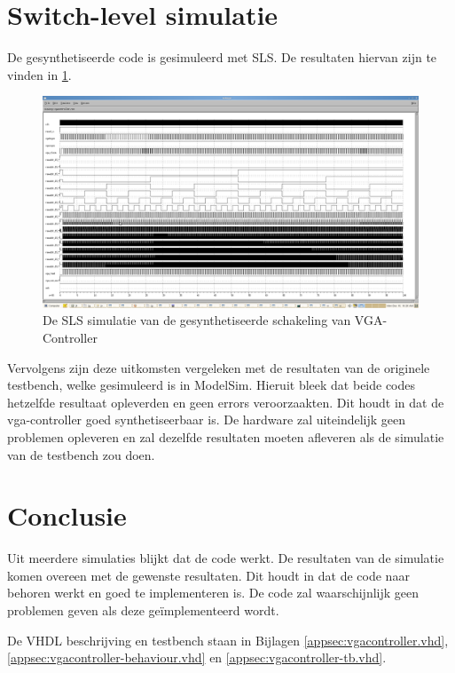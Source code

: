 \documentclass{scrartcl}  %
\begin{document}
\section{Switch-level simulatie}
De gesynthetiseerde code is gesimuleerd met SLS. De resultaten hiervan zijn te vinden in \ref{fig:switch}. 

\begin{figure}[H]
\centering
		\includegraphics[width=1\textwidth]{resource/simslsvga-final.png}
		
		\caption{De SLS simulatie van de gesynthetiseerde schakeling van VGA-Controller}
		\label{fig:switch}
\end{figure}
Vervolgens zijn deze uitkomsten vergeleken met de resultaten van de originele testbench, welke gesimuleerd is in ModelSim. Hieruit bleek dat beide codes hetzelfde resultaat opleverden en geen errors veroorzaakten. Dit houdt in dat de vga-controller goed synthetiseerbaar is. De hardware zal uiteindelijk geen problemen opleveren en zal dezelfde resultaten moeten afleveren als de simulatie van de testbench zou doen. 


\section{Conclusie}
Uit meerdere simulaties blijkt dat de code werkt. De resultaten van de simulatie komen overeen met de gewenste resultaten. Dit houdt in dat de code naar behoren werkt en goed te implementeren is. De code zal waarschijnlijk geen problemen geven als deze geïmplementeerd wordt.

De VHDL beschrijving en testbench staan in Bijlagen \ref{appsec:vgacontroller.vhd}, \ref{appsec:vgacontroller-behaviour.vhd} en \ref{appsec:vgacontroller-tb.vhd}.
\end{document}
